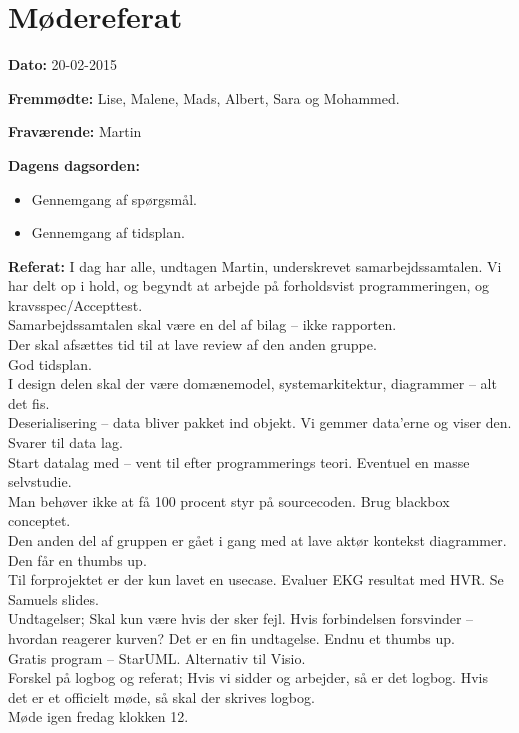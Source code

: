 \chapter{Mødereferat}

\textbf{Dato:} 20-02-2015

\textbf{Fremmødte:} Lise, Malene, Mads, Albert, Sara og Mohammed. 

\textbf{Fraværende:} Martin

\textbf{Dagens dagsorden:} 
\begin{itemize}
	\item Gennemgang af spørgsmål.
	\item Gennemgang af tidsplan. 
\end{itemize}

\textbf{Referat:}
I dag har alle, undtagen Martin, underskrevet samarbejdssamtalen. Vi har delt op i hold, og begyndt at arbejde på forholdsvist programmeringen, og kravsspec/Accepttest. 
\\Samarbejdssamtalen skal være en del af bilag – ikke rapporten. 
\\Der skal afsættes tid til at lave review af den anden gruppe. 
\\God tidsplan. 
\\I design delen skal der være domænemodel, systemarkitektur, diagrammer – alt det fis. 
\\Deserialisering – data bliver pakket ind objekt. Vi gemmer data’erne og viser den. Svarer til data lag. 
\\Start datalag med – vent til efter programmerings teori. Eventuel en masse selvstudie. 
\\Man behøver ikke at få 100 procent styr på sourcecoden. Brug blackbox conceptet. 
\\Den anden del af gruppen er gået i gang med at lave aktør kontekst diagrammer. Den får en thumbs up. 
\\Til forprojektet er der kun lavet en usecase. Evaluer EKG resultat med HVR. Se Samuels slides. 
\\Undtagelser; Skal kun være hvis der sker fejl. Hvis forbindelsen forsvinder – hvordan reagerer kurven? Det er en fin undtagelse. Endnu et thumbs up. 
\\Gratis program – StarUML. Alternativ til Visio. 
\\Forskel på logbog og referat; Hvis vi sidder og arbejder, så er det logbog. Hvis det er et officielt møde, så skal der skrives logbog.
\\Møde igen fredag klokken 12. 


